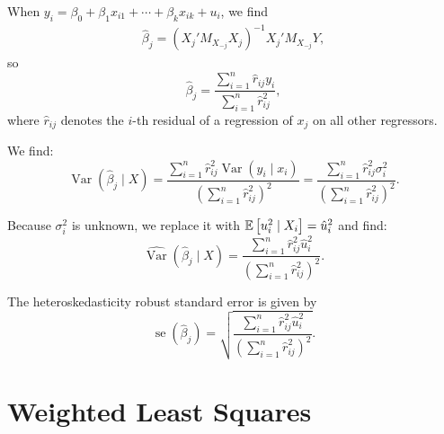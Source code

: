 	\begin{proposition}
		When $y_i = \beta_0 + \beta_1 x_{i1} + \cdots + \beta_k x_{ik} + u_i$, we find
		\begin{align*}
			\hat{\beta}_j = \left( X_j' M_{X_{-j}} X_j \right)^{-1} X_j' M_{X_{-j}} Y
		,\end{align*} so \[
			\hat{\beta}_j = \frac{\sum_{i=1}^{n} \hat{r}_{ij} y_i}{\sum_{i=1}^{n} \hat{r}_{ij}^2}
		,\] where $\hat{r}_{ij}$ denotes the $i$-th residual of a regression of $x_j$ on all other regressors.
	
	We find: \[
		\operatorname{Var}(\hat{\beta}_j \mid X) = \frac{\sum_{i=1}^{n} \hat{r}_{ij}^2 \operatorname{Var}(y_i \mid x_i)}{(\sum_{i=1}^{n} \hat{r}_{ij}^2)^2} = \frac{\sum_{i=1}^{n} \hat{r}_{ij}^2 \sigma_i^2}{(\sum_{i=1}^{n} \hat{r}_{ij}^2)^2}
	.\] 
	
	Because $\sigma_i^2$ is unknown, we replace it with $\mathbb{E}\left[u_i^2 \mid X_i\right] = \hat{u}_i^2$ and find: \[
		\widehat{\operatorname{Var}}(\hat{\beta}_j \mid X) = \frac{\sum_{i=1}^{n} \hat{r}_{ij}^2 \hat{u}_i^2}{(\sum_{i=1}^{n} \hat{r}_{ij}^2)^2}
	.\] 
	
	The heteroskedasticity robust standard error is given by \[
		\operatorname{se}(\hat{\beta}_j) = \sqrt{\frac{\sum_{i=1}^{n} \hat{r}_{ij}^2 \hat{u}_i^2}{(\sum_{i=1}^{n} \hat{r}_{ij}^2)^2}}
	.\] 
\end{proposition}

\section{Weighted Least Squares}

